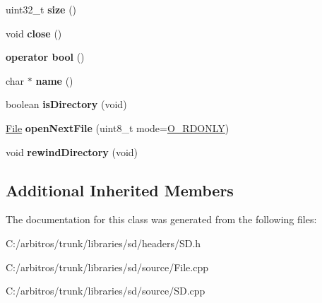 \begin{DoxyCompactItemize}
\item 
\hypertarget{class_file_ad99ea5881a3c8a380f6835cf10fa151d}{uint32\-\_\-t {\bfseries size} ()}\label{class_file_ad99ea5881a3c8a380f6835cf10fa151d}

\item 
\hypertarget{class_file_a5ae591df94fc66ccb85cbb6565368bca}{void {\bfseries close} ()}\label{class_file_a5ae591df94fc66ccb85cbb6565368bca}

\item 
\hypertarget{class_file_a9b3baad8c612d81b96e46f84d7e97580}{{\bfseries operator bool} ()}\label{class_file_a9b3baad8c612d81b96e46f84d7e97580}

\item 
\hypertarget{class_file_a231c1cd826243b8729b7a72d55509c9d}{char $\ast$ {\bfseries name} ()}\label{class_file_a231c1cd826243b8729b7a72d55509c9d}

\item 
\hypertarget{class_file_a3f56e55bc261e98ffa3f3fdb5da9465d}{boolean {\bfseries is\-Directory} (void)}\label{class_file_a3f56e55bc261e98ffa3f3fdb5da9465d}

\item 
\hypertarget{class_file_aa08cdb9bd6f1c871a583ee92314d319a}{\hyperlink{class_file}{File} {\bfseries open\-Next\-File} (uint8\-\_\-t mode=\hyperlink{_sd_base_file_8h_ac13ca62d7e6f8f6d657d4607474652bf}{O\-\_\-\-R\-D\-O\-N\-L\-Y})}\label{class_file_aa08cdb9bd6f1c871a583ee92314d319a}

\item 
\hypertarget{class_file_aeec4189b19df62a4b571b2dc7504c888}{void {\bfseries rewind\-Directory} (void)}\label{class_file_aeec4189b19df62a4b571b2dc7504c888}

\end{DoxyCompactItemize}
\subsection*{Additional Inherited Members}


The documentation for this class was generated from the following files\-:\begin{DoxyCompactItemize}
\item 
C\-:/arbitros/trunk/libraries/sd/headers/S\-D.\-h\item 
C\-:/arbitros/trunk/libraries/sd/source/File.\-cpp\item 
C\-:/arbitros/trunk/libraries/sd/source/S\-D.\-cpp\end{DoxyCompactItemize}
